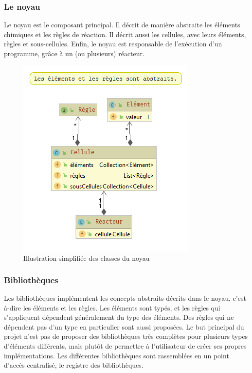 \documentclass[a4paper, 12pt]{article}
\begin{document}
\subsubsection{Le noyau}
Le noyau est le composant principal. Il décrit de manière abstraite les éléments chimiques et les règles de réaction. Il décrit aussi les cellules, avec leurs éléments, règles et sous-cellules. Enfin, le noyau est responsable de l’exécution d’un programme, grâce à un (ou plusieurs) réacteur.

\begin{figure}[!ht]
  \centering
  \includegraphics[scale=0.8]{./img/Structure_noyau.png}
  \caption{Illustration simplifiée des classes du noyau}
\end{figure}

\subsubsection{Bibliothèques}
Les bibliothèques implémentent les concepts abstraits décrits dans le noyau, c’est-à-dire les éléments et les règles. Les éléments sont typés, et les règles qui s’appliquent dépendent généralement du type des éléments. Des règles qui ne dépendent pas d’un type en particulier sont aussi proposées. Le but principal du projet n’est pas de proposer des bibliothèques très complètes pour plusieurs types d’éléments différents, mais plutôt de permettre à l’utilisateur de créer ses propres implémentations. Les différentes bibliothèques sont rassemblées en un point d’accès centralisé, le registre des bibliothèques.
\end{document}
